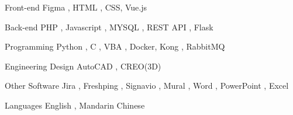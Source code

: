 

\begin{cvskills}

  \cvskill
    {Front-end} %
    {Figma , HTML , CSS, Vue.js} %

  \cvskill
    {Back-end} %
    {PHP , Javascript , MYSQL , REST API , Flask} %

  \cvskill
    {Programming} %
    {Python , C , VBA , Docker, Kong , RabbitMQ} %
    
  \cvskill
    {Engineering Design} %
    {AutoCAD , CREO(3D)} %

  \cvskill
    {Other Software} %
    {Jira , Freshping , Signavio , Mural , Word , PowerPoint , Excel} %

  \cvskill
    {Languages} %
    {English , Mandarin Chinese} %

\end{cvskills}
